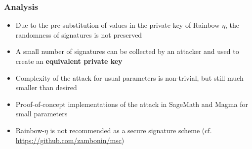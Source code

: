 \documentclass[12pt]{beamer}
\begin{document}
\begin{frame}
  \frametitle{Analysis}
  \begin{itemize}
    \item Due to the pre-substitution of values in the private key of
        Rainbow-$\eta$, the randomness of signatures is not preserved
    \item A small number of signatures can be collected by an attacker and used
        to create an \textbf{equivalent private key}
    \item Complexity of the attack for usual parameters is non-trivial, but
        still much smaller than desired
    \item Proof-of-concept implementations of the attack in SageMath and Magma
        for small parameters
    \item Rainbow-$\eta$ is not recommended as a secure signature scheme
        (cf. \url{https://github.com/zambonin/msc})
  \end{itemize}
\end{frame}
\end{document}
